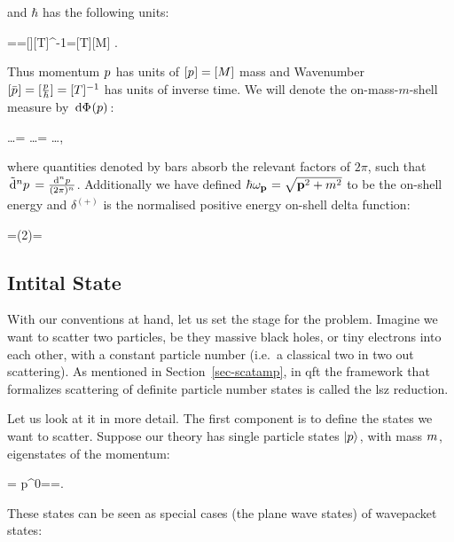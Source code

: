 \documentclass[
  10pt,
  a4paper,
  DIV=11,
  numbers=noendperiod,
  twoside]{scrreprt}
\let\[\relax \let\]\relax %
\DeclareRobustCommand{\[}{\begin{equation}}
\DeclareRobustCommand{\]}{\end{equation}}
\begin{document}
and \(\hbar\) has the following units:

\[
\energy=\hbar \omega\implies [M]=[\hbar][T]^{-1}\implies [\hbar]=[T][M]
.\]

Thus momentum \(\emom\) has units of \([\emom]=[M]\) mass and Wavenumber
\([\bar{\emom}]=[\frac{\emom}{\hbar}]=[T]^{-1}\) has units of inverse
time. We will denote the on-mass-\(m\)-shell measure by
\(\ddP{p}\):

\[
\int {} \dots      = \int {} \dots = \int {} \dots,
\]

where quantities denoted by bars absorb the relevant factors of
\(2\pi\), such that \(\dn[n]{p}=\frac{\dd[n]p}{(2\pi)^n}\). Additionally
we have defined \(\hbar\shellen=\sqrt{\tv{p}^2+m^2}\) to be the on-shell
energy and \(\delta^{(+)}\) is the normalised positive energy on-shell
delta function:

\[
=(2\pi)=
\]

\hypertarget{intital-state}{%
\subsection{Intital State}\label{intital-state}}

With our conventions at hand, let us set the stage for the problem.
Imagine we want to scatter two particles, be they massive black holes,
or tiny electrons into each other, with a constant particle number
(i.e.~a classical two in two out scattering). As mentioned in
Section~\ref{sec-scatamp}, in \gls{qft} the framework that formalizes
scattering of definite particle number states is called the \gls{lsz}
reduction.

{}

Let us look at it in more detail. The first component is to define the
states we want to scatter. Suppose our theory has single particle states
\(\momket\), with mass \(\mass\), eigenstates of the momentum:

\[\ct{\momop}\momket=\ct{\emom}\momket \quad {} \quad p^0=\hbar\shellen=.\]

These states can be seen as special cases (the plane wave states) of
wavepacket states:
\end{document}
